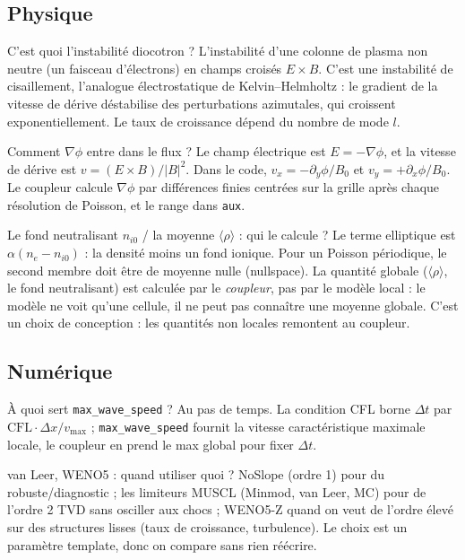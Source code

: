 \documentclass[11pt]{article}
\newcommand{\code}[1]{\texttt{\small #1}}
\begin{document}
\subsection{Physique}

\begin{qa}{C'est quoi l'instabilité diocotron ?}
L'instabilité d'une colonne de plasma non neutre (un faisceau d'électrons) en champs
croisés $E\times B$. C'est une instabilité de cisaillement, l'analogue électrostatique de
Kelvin–Helmholtz : le gradient de la vitesse de dérive déstabilise des perturbations
azimutales, qui croissent exponentiellement. Le taux de croissance dépend du nombre de
mode $l$.
\end{qa}

\begin{qa}{Comment $\nabla\phi$ entre dans le flux ?}
Le champ électrique est $E = -\nabla\phi$, et la vitesse de dérive est
$v = (E\times B)/|B|^2$. Dans le code, $v_x = -\partial_y\phi / B_0$ et
$v_y = +\partial_x\phi / B_0$. Le coupleur calcule $\nabla\phi$ par différences finies
centrées sur la grille après chaque résolution de Poisson, et le range dans \code{aux}.
\end{qa}

\begin{qa}{Le fond neutralisant $n_{i0}$ / la moyenne $\langle\rho\rangle$ : qui le calcule ?}
Le terme elliptique est $\alpha(n_e - n_{i0})$ : la densité moins un fond ionique. Pour un
Poisson périodique, le second membre doit être de moyenne nulle (nullspace). La quantité
globale ($\langle\rho\rangle$, le fond neutralisant) est calculée par le \emph{coupleur},
pas par le modèle local : le modèle ne voit qu'une cellule, il ne peut pas connaître une
moyenne globale. C'est un choix de conception : les quantités non locales remontent au
coupleur.
\end{qa}

\subsection{Numérique}

\begin{qa}{À quoi sert \code{max\_wave\_speed} ?}
Au pas de temps. La condition CFL borne $\Delta t$ par $\mathrm{CFL}\cdot\Delta x / v_{\max}$ ;
\code{max\_wave\_speed} fournit la vitesse caractéristique maximale locale, le coupleur en
prend le max global pour fixer $\Delta t$.
\end{qa}

\begin{qa}{van Leer, WENO5 : quand utiliser quoi ?}
NoSlope (ordre 1) pour du robuste/diagnostic ; les limiteurs MUSCL (Minmod, van Leer, MC)
pour de l'ordre 2 TVD sans osciller aux chocs ; WENO5-Z quand on veut de l'ordre élevé sur
des structures lisses (taux de croissance, turbulence). Le choix est un paramètre template,
donc on compare sans rien réécrire.
\end{qa}
\end{document}
